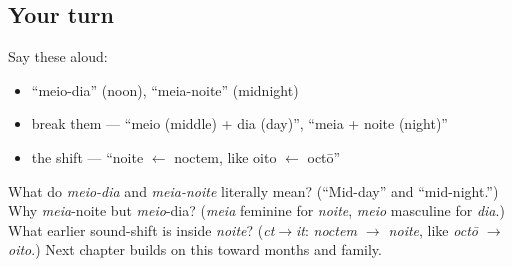 \subsection*{Your turn}
Say these aloud:

\begin{itemize}
\raggedright
  \item \textquotedblleft{}meio-dia\textquotedblright{} (noon), \textquotedblleft{}meia-noite\textquotedblright{} (midnight)
  \item break them — \textquotedblleft{}meio (middle) + dia (day)\textquotedblright{}, \textquotedblleft{}meia + noite (night)\textquotedblright{}
  \item the shift — \textquotedblleft{}noite $\leftarrow$ noctem, like oito $\leftarrow$ octō\textquotedblright{}
\end{itemize}

\begin{tcolorbox}[breakable,colback=teal!4,colframe=teal!35!black,title={Before you move on}]
What do \emph{meio-dia} and \emph{meia-noite} literally mean? (\textquotedblleft{}Mid-day\textquotedblright{} and \textquotedblleft{}mid-night.\textquotedblright{}) Why \emph{meia}-noite but \emph{meio}-dia? (\emph{meia} feminine for \emph{noite}, \emph{meio} masculine for \emph{dia}.) What earlier sound-shift is inside \emph{noite}? (\emph{ct$\to$it}: \emph{noctem $\to$ noite}, like \emph{octō $\to$ oito}.) Next chapter builds on this toward months and family.
\end{tcolorbox}
